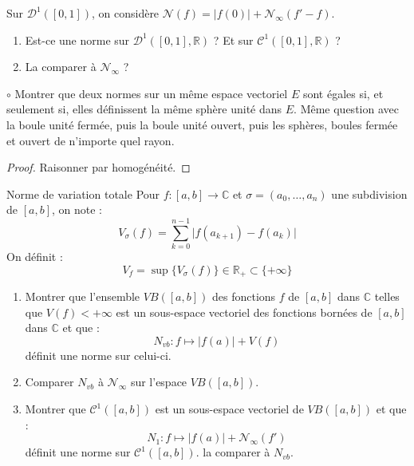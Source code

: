 \documentclass[french,a4paper]{article}
\newcommand{\R}{\mathbb{R}}
\newcommand{\C}{\mathbb{C}}
\theoremstyle{plain}
\theoremstyle{definition}
\theoremstyle{remark}
\begin{document}
\begin{ex}{}
	Sur $\mathcal{D}^1([0,1])$, on considère $\mathcal{N}(f)=\lvert f(0)\rvert+\mathcal{N}_\infty(f'-f)$.
	\begin{enumerate}
		\item Est-ce une norme sur $\mathcal{D}^1([0,1],\R)$ ? Et sur $\mathcal{C}^1([0,1],\R)$ ?
		\item La comparer à $\mathcal{N}_\infty$ ?
	\end{enumerate}
\end{ex}

\begin{ex}{$\circ$}
	Montrer que deux normes sur un même espace vectoriel $E$ sont égales si, et seulement si, elles définissent la même sphère unité dans $E$. Même question avec la boule unité fermée, puis la boule unité ouvert, puis les sphères, boules fermée et ouvert de n'importe quel rayon.
\end{ex}
\begin{proof}
	Raisonner par homogénéité.
\end{proof}

\begin{ex}{Norme de variation totale}
	Pour $f:[a,b]\to\C$ et $\sigma=(a_0,\ldots,a_n)$ une subdivision de $[a,b]$, on note : $$V_\sigma(f)=\sum_{k=0}^{n-1}\lvert f(a_{k+1})-f(a_k)\rvert$$ On définit : $$V_f=\sup\{V_\sigma(f)\}\in\R_+\subset\{+\infty\}$$
	\begin{enumerate}
		\item Montrer que l'ensemble $VB([a,b])$ des fonctions $f$ de $[a,b]$ dans $\C$ telles que $V(f)<+\infty$ est un sous-espace vectoriel des fonctions bornées de $[a,b]$ dans $\C$ et que : $$N_{vb}:f\mapsto\lvert f(a)\rvert+V(f)$$ définit une norme sur celui-ci.
		\item Comparer $N_{vb}$ à $\mathcal{N}_\infty$ sur l'espace $VB([a,b])$.
		\item Montrer que $\mathcal{C}^1([a,b])$ est un sous-espace vectoriel de $VB([a,b])$ et que : $$N_1:f\mapsto\lvert f(a)\rvert+\mathcal{N}_\infty(f')$$ définit une norme sur $\mathcal{C}^1([a,b])$. la comparer à $N_{vb}$.
	\end{enumerate}
\end{ex}
\end{document}
